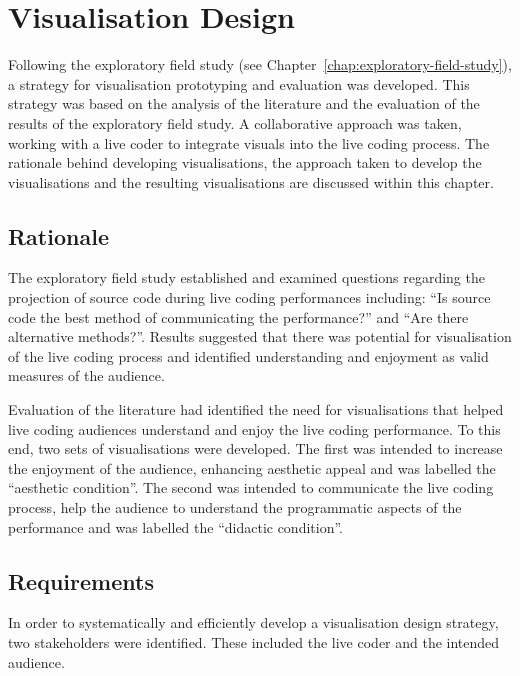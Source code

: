 
\chapter{Visualisation Design}
\label{chap:visualisation-design}

Following the exploratory field study (see Chapter~\ref{chap:exploratory-field-study}), a strategy for visualisation prototyping and evaluation was developed. This strategy was based on the analysis of the literature and the evaluation of the results of the exploratory field study. A collaborative approach was taken, working with a live coder to integrate visuals into the live coding process. The rationale behind developing visualisations, the approach taken to develop the visualisations and the resulting visualisations are discussed within this chapter.

\section{Rationale}


The exploratory field study established and examined questions regarding the projection of source code during live coding performances including: ``Is source code the best method of communicating the performance?'' and ``Are there alternative methods?''. Results suggested that there was potential for visualisation of the live coding process and identified understanding and enjoyment as valid measures of the audience.

Evaluation of the literature had identified the need for visualisations that helped live coding audiences understand and enjoy the live coding performance. To this end, two sets of visualisations were developed. The first was intended to increase the enjoyment of the audience, enhancing aesthetic appeal and was labelled the ``aesthetic condition''. The second was intended to communicate the live coding process, help the audience to understand the programmatic aspects of the performance and was labelled the ``didactic condition''.

\section{Requirements}

In order to systematically and efficiently develop a visualisation design strategy, two stakeholders were identified. These included the live coder and the intended audience.

